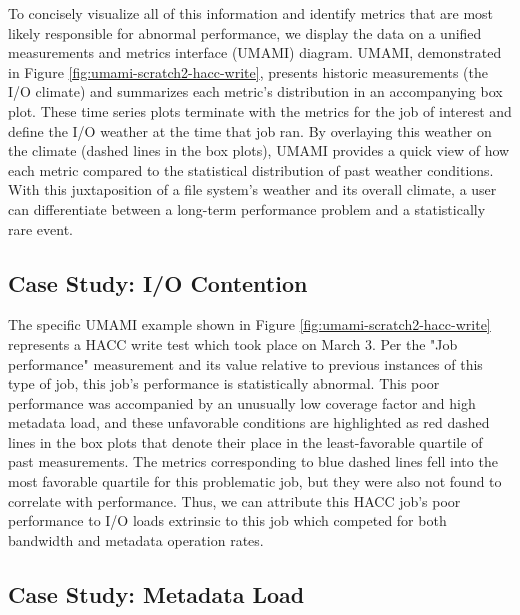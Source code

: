 To concisely visualize all of this information and identify metrics that are most likely responsible for abnormal performance, we display the data on a unified measurements and metrics interface (UMAMI) diagram.
UMAMI, demonstrated in Figure \ref{fig:umami-scratch2-hacc-write}, presents historic measurements (the I/O climate) and summarizes each metric's distribution in an accompanying box plot.
These time series plots terminate with the metrics for the job of interest and define the I/O weather at the time that job ran.
By overlaying this weather on the climate (dashed lines in the box plots), UMAMI provides a quick view of how each metric compared to the statistical distribution of past weather conditions.
With this juxtaposition of a file system's weather and its overall climate, a user can differentiate between a long-term performance problem and a statistically rare event.%


\subsection{Case Study: I/O Contention}

The specific UMAMI example shown in Figure \ref{fig:umami-scratch2-hacc-write} represents a HACC write test which took place on March 3.
Per the "Job performance" measurement and its value relative to previous instances of this type of job, this job's performance is statistically abnormal.
This poor performance was accompanied by an unusually low coverage factor and high metadata load, and these unfavorable conditions are highlighted as red dashed lines in the box plots that denote their place in the least-favorable quartile of past measurements.
The metrics corresponding to blue dashed lines fell into the most favorable quartile for this problematic job, but they were also not found to correlate with performance.
Thus, we can attribute this HACC job's poor performance to I/O loads extrinsic to this job which competed for both bandwidth and metadata operation rates.

\subsection{Case Study: Metadata Load}

